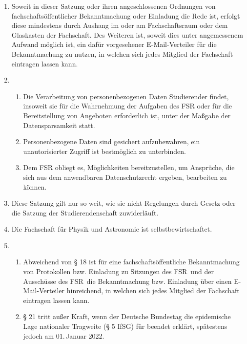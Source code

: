 \documentclass[a4paper, 12pt]{article}
\newcommand{\rates}{FSR}
\begin{document}
\begin{enumerate}[leftmargin=0cm]
	
	\item {}
	
	Soweit in dieser Satzung oder ihren angeschlossenen Ordnungen von fachschaftsöffentlicher Bekanntmachung oder Einladung die Rede ist, erfolgt diese mindestens durch Aushang im oder am Fachschaftsraum oder dem Glaskasten der Fachschaft. Des Weiteren ist, soweit dies unter angemessenem Aufwand möglich ist, ein dafür vorgesehener E-Mail-Verteiler für die Bekanntmachung zu nutzen, in welchen sich jedes Mitglied der Fachschaft eintragen lassen kann.
	
	\item {}
	
	\begin{enumerate}[leftmargin=0cm]
		\item Die Verarbeitung von personenbezogenen Daten Studierender findet, insoweit
		sie für die Wahrnehmung der Aufgaben des FSR oder für die Bereitstellung von Angeboten erforderlich ist, unter der Maßgabe der Datensparsamkeit statt.
		\item Personenbezogene Daten sind gesichert aufzubewahren, ein unautorisierter Zugriff ist bestmöglich zu unterbinden.
		\item Dem FSR obliegt es, Möglichkeiten bereitzustellen, um Ansprüche, die sich aus dem anwendbaren Datenschutzrecht ergeben, bearbeiten zu können.
	\end{enumerate}
	
	\item {}
	
	Diese Satzung gilt nur so weit, wie sie nicht Regelungen durch Gesetz oder die Satzung der Studierendenschaft zuwiderläuft.
	
	\item {}
	
	Die Fachschaft für Physik und Astronomie ist selbstbewirtschaftet.
	
	\item {}
	
	\begin{enumerate}[leftmargin=0cm]
		\item Abweichend von § 18 ist für eine fachschaftsöffentliche Bekanntmachung von Protokollen bzw. Einladung zu Sitzungen des \rates~und der Ausschüsse des \rates~die Bekanntmachung bzw. Einladung über einen E-Mail-Verteiler hinreichend, in welchen sich jedes Mitglied der Fachschaft eintragen lassen kann.
		\item § 21 tritt außer Kraft, wenn der Deutsche Bundestag die epidemische Lage nationaler Tragweite (§ 5 IfSG) für beendet erklärt, spätestens jedoch am 01.\,Januar 2022.
	\end{enumerate}
	

\end{enumerate}
\end{document}
